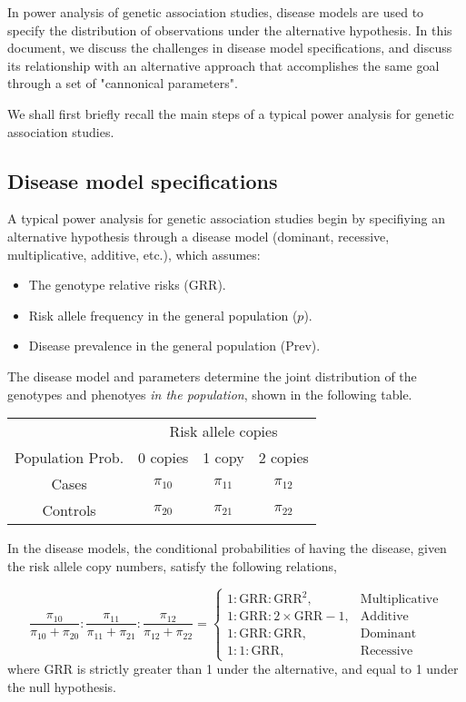 In power analysis of genetic association studies, disease models are used to specify the distribution of observations under the alternative hypothesis.
In this document, we discuss the challenges in disease model specifications, and discuss its relationship with an alternative approach that accomplishes the same goal through a set of "cannonical parameters".

We shall first briefly recall the main steps of a typical power analysis for genetic association studies.

\subsection{Disease model specifications}

A typical power analysis for genetic association studies begin by specifiying an alternative hypothesis through a disease model (dominant, recessive, multiplicative, additive, etc.), which assumes:

\begin{itemize}
    \item The genotype relative risks (GRR).
    \item Risk allele frequency in the general population ($p$).
    \item Disease prevalence in the general population (Prev).
\end{itemize}

The disease model and parameters determine the joint distribution of the genotypes and phenotyes {\it in the population}, shown in the following table.

\begin{center}
    \begin{tabular}{cccc}
    \hline
    & \multicolumn{3}{c}{Risk allele copies} \\
    \cline{2-4}
    Population Prob. & 0 copies & 1 copy & 2 copies \\
    \hline
    Cases & $\pi_{10}$ & $\pi_{11}$ & $\pi_{12}$ \\
    Controls & $\pi_{20}$ & $\pi_{21}$ & $\pi_{22}$ \\
    \hline
    \end{tabular}
\end{center}

In the disease models, the conditional probabilities of having the disease, given the risk allele copy numbers, satisfy the following relations,

\begin{equation} \label{eq:GRR}
    \frac{\pi_{10}}{\pi_{10} + \pi_{20}} : \frac{\pi_{11}}{\pi_{11} + \pi_{21}} : \frac{\pi_{12}}{\pi_{12} + \pi_{22}}
    = \begin{cases}
    1 : \text{GRR} : \text{GRR}^2, &\text{Multiplicative} \\
    1 : \text{GRR} : 2\times\text{GRR}-1, & \text{Additive} \\
    1 : \text{GRR} : \text{GRR}, & \text{Dominant} \\
    1 : 1 : \text{GRR}, & \text{Recessive}
\end{cases}
\end{equation}
where GRR is strictly greater than 1 under the alternative, and equal to 1 under the null hypothesis.

